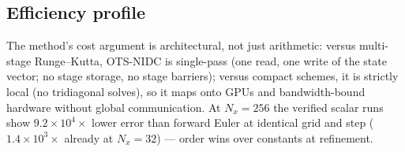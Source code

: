 \subsection{Efficiency profile}

The method's cost argument is architectural, not just arithmetic: versus multi-stage Runge--Kutta, OTS-NIDC is single-pass (one read, one write of the state vector; no stage storage, no stage barriers); versus compact schemes, it is strictly local (no tridiagonal solves), so it maps onto GPUs and bandwidth-bound hardware without global communication. At $N_x=256$ the verified scalar runs show $9.2\times10^{4}\times$ lower error than forward Euler at identical grid and step ($1.4\times10^{3}\times$ already at $N_x=32$) \tagV --- order wins over constants at refinement.
